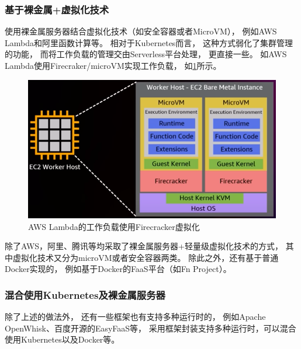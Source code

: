\subsubsection{基于裸金属+虚拟化技术}
使用裸金属服务器结合虚拟化技术（如安全容器或者MicroVM），
例如AWS Lambda和阿里函数计算等。
相对于Kubernetes而言，
这种方式弱化了集群管理的功能，
而将工作负载的管理交由Serverless平台处理，
更直接一些。
如AWS Lambda使用Firecraker/microVM实现工作负载，
如\cref{lambda_worker}所示。

\begin{figure}[ht!]
    \centering
    \includegraphics[width=0.7\linewidth]{images/lambda_worker.png}
    \caption{AWS Lambda的工作负载使用Firecracker虚拟化\cite{aws_lambda_2022}}
    \label{lambda_worker}
\end{figure}

除了AWS，阿里、腾讯等均采取了裸金属服务器+轻量级虚拟化技术的方式，
其中虚拟化技术又分为microVM或者安全容器两类。
除此之外，还有基于普通Docker实现的，
例如基于Docker的FaaS平台（如Fn Project）。

\subsubsection{混合使用Kubernetes及裸金属服务器}
除了上述的做法外，
还有一些框架也有支持多种运行时的，
例如Apache OpenWhisk、百度开源的EasyFaaS等，
采用框架封装支持多种运行时，可以混合使用Kubernetes以及Docker等。